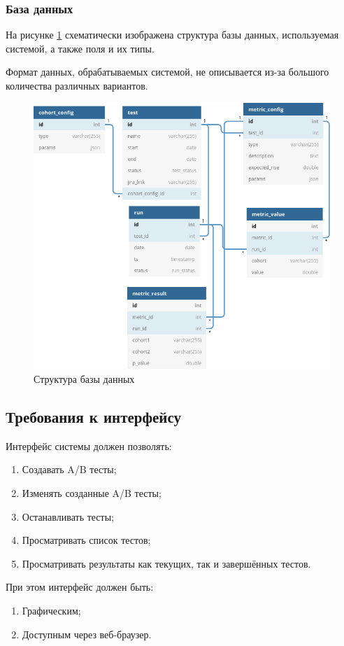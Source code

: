 \documentclass[../document.tex]{subfiles}
\begin{document}
	\subsubsection{База данных}
	\par На рисунке \ref{image:db_plot} схематически изображена структура базы данных, используемая системой, а также поля и их типы.
	\par Формат данных, обрабатываемых системой, не описывается из-за большого количества различных вариантов.
	\begin{figure}[h] 
		\includegraphics[width=\linewidth]{A_B v.3.0.png}
		\caption{\label{image:db_plot}Структура базы данных}
	\end{figure}
	\subsection{Требования к интерфейсу}
	\par Интерфейс системы должен позволять:
	\begin{enumerate}
		\item Создавать A/B тесты;
		\item Изменять созданные A/B тесты;
		\item Останавливать тесты;
		\item Просматривать список тестов;
		\item Просматривать результаты как текущих, так и завершённых тестов.
	\end{enumerate}
	\par При этом интерфейс должен быть:
	\begin{enumerate}
		\item Графическим;
		\item Доступным через веб-браузер.
	\end{enumerate}
\end{document}
